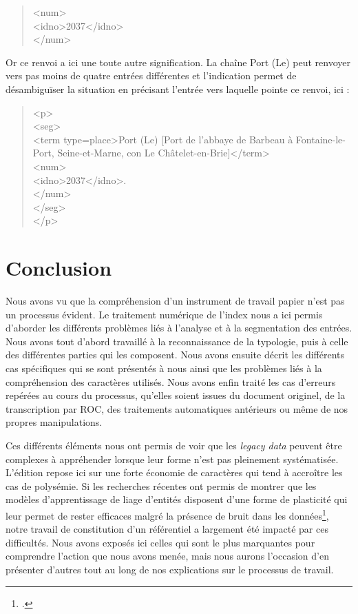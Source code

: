 \documentclass[a4paper,12pt,twoside]{book}
\begin{document}
	\begin{quotation}
		<num>\\
		\indent{}2037</idno>\\
	\end{quotation}

	\noindent Or ce renvoi a ici une toute autre signification. La chaîne \og Port (Le)\fg{} peut renvoyer vers pas moins de quatre entrées différentes et l'indication \og [2037]\fg{} permet de désambiguïser la situation en précisant l'entrée vers laquelle pointe ce renvoi, ici :
	
	\begin{quotation}
            <p>\\
				\indent{}\\
				\indent\indent\indent<term type=\textquotesingle place\textquotesingle >Port (Le) [Port de l'abbaye de Barbeau à Fontaine-le-Port,
				Seine-et-Marne, con Le Châtelet-en-Brie]</term>\\
				\indent\indent{}\\
				\indent\indent\indent\indent<idno>2037</idno>.\\
				\indent\indent\indent</num>\\
				\indent\indent</seg>\\
				\indent</p>
	\end{quotation}
	
	\section*{Conclusion}
	
	Nous avons vu que la compréhension d'un instrument de travail papier n'est pas un processus évident. Le traitement numérique de l'index nous a ici permis d'aborder les différents problèmes liés à l'analyse et à la segmentation des entrées. Nous avons tout d'abord travaillé à la reconnaissance de la typologie, puis à celle des différentes parties qui les composent. Nous avons ensuite décrit les différents cas spécifiques qui se sont présentés à nous ainsi que les problèmes liés à la compréhension des caractères utilisés. Nous avons enfin traité les cas d'erreurs repérées au cours du processus, qu'elles soient issues du document originel, de la transcription par ROC, des traitements automatiques antérieurs ou même de nos propres manipulations.
	
	Ces différents éléments nous ont permis de voir que les \textit{legacy data} peuvent être complexes à appréhender lorsque leur forme n'est pas pleinement systématisée. L'édition repose ici sur une forte économie de caractères qui tend à accroître les cas de polysémie. Si les recherches récentes ont permis de montrer que les modèles d'apprentissage de liage d'entités disposent d'une forme de plasticité qui leur permet de rester efficaces malgré la présence de bruit dans les données\footcite{linhares_pontes_impact_2019, koudoro-parfait_reconnaissance_2022}, notre travail de constitution d'un référentiel a largement été impacté par ces difficultés. Nous avons exposés ici celles qui sont le plus marquantes pour comprendre l'action que nous avons menée, mais nous aurons l'occasion d'en présenter d'autres tout au long de nos explications sur le processus de travail.
	
\end{document}
